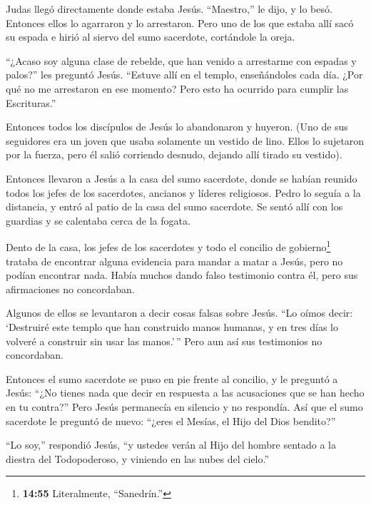  Judas llegó directamente donde estaba Jesús. ``Maestro,''
le dijo, y lo besó.  Entonces ellos lo agarraron y lo
arrestaron.  Pero uno de los que estaba allí sacó su espada
e hirió al siervo del sumo sacerdote, cortándole la oreja.

 ``¿Acaso soy alguna clase de rebelde, que han venido a
arrestarme con espadas y palos?'' les preguntó Jesús. 
``Estuve allí en el templo, enseñándoles cada día. ¿Por qué no me
arrestaron en ese momento? Pero esto ha ocurrido para cumplir las
Escrituras.''

 Entonces todos los discípulos de Jesús lo abandonaron y
huyeron.  (Uno de sus seguidores era un joven que usaba
solamente un vestido de lino.  Ellos lo sujetaron por la
fuerza, pero él salió corriendo desnudo, dejando allí tirado su
vestido).

 Entonces llevaron a Jesús a la casa del sumo sacerdote,
donde se habían reunido todos los jefes de los sacerdotes, ancianos y
líderes religiosos.  Pedro lo seguía a la distancia, y
entró al patio de la casa del sumo sacerdote. Se sentó allí con los
guardias y se calentaba cerca de la fogata.

 Dento de la casa, los jefes de los sacerdotes y todo el
concilio de gobierno\footnote{\textbf{14:55} Literalmente, ``Sanedrín.''}
trataba de encontrar alguna evidencia para mandar a matar a Jesús, pero
no podían encontrar nada.  Había muchos dando falso
testimonio contra él, pero sus afirmaciones no concordaban.

 Algunos de ellos se levantaron a decir cosas falsas sobre
Jesús.  ``Lo oímos decir: `Destruiré este templo que han
construido manos humanas, y en tres días lo volveré a construir sin usar
las manos.'\,''  Pero aun así sus testimonios no
concordaban.

 Entonces el sumo sacerdote se puso en pie frente al
concilio, y le preguntó a Jesús: ``¿No tienes nada que decir en
respuesta a las acusaciones que se han hecho en tu contra?''
 Pero Jesús permanecía en silencio y no respondía. Así que
el sumo sacerdote le preguntó de nuevo: ``¿eres el Mesías, el Hijo del
Dios bendito?''

 ``Lo soy,'' respondió Jesús, ``y ustedes verán al Hijo del
hombre sentado a la diestra del Todopoderoso, y viniendo en las nubes
del cielo.''

